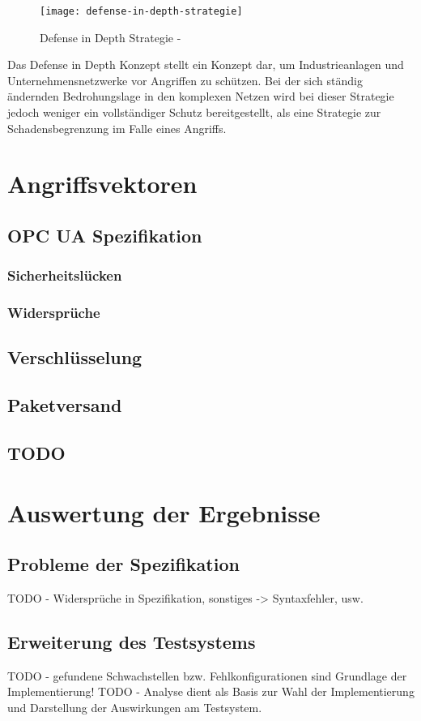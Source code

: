 \begin{figure}[h]
    \centering
    \texttt{[image: defense-in-depth-strategie]}
    \caption{Defense in Depth Strategie - \cite{kuipers2006}}
    \label{Kap3:Defense-in-Depth}
\end{figure}

\clearpage

Das Defense in Depth Konzept stellt ein Konzept dar, um Industrieanlagen und Unternehmensnetzwerke vor Angriffen zu schützen. Bei der sich ständig ändernden Bedrohungslage in den komplexen Netzen wird bei dieser Strategie jedoch weniger ein vollständiger Schutz bereitgestellt, als eine Strategie zur Schadensbegrenzung im Falle eines Angriffs.

\section{Angriffsvektoren}
\subsection{\ac{OPC UA} Spezifikation}
\subsubsection{Sicherheitslücken}
\subsubsection{Widersprüche}
\subsubsection{}

\subsection{Verschlüsselung}
\subsection{Paketversand}
\subsection{TODO}

\section{Auswertung der Ergebnisse}
\subsection{Probleme der Spezifikation}
TODO - Widersprüche in Spezifikation, sonstiges -> Syntaxfehler, usw.

\subsection{Erweiterung des Testsystems}
TODO - gefundene Schwachstellen bzw. Fehlkonfigurationen sind Grundlage der Implementierung!
TODO - Analyse dient als Basis zur Wahl der Implementierung und Darstellung der Auswirkungen am Testsystem.